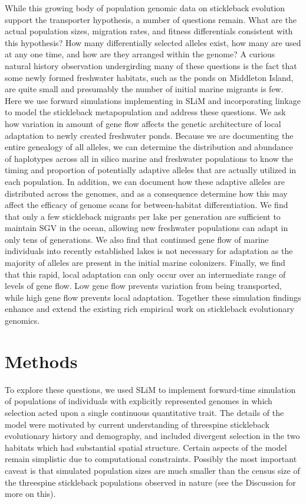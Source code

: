 \documentclass{article}
\begin{document}
While this growing body of population genomic data on stickleback evolution support the transporter hypothesis, a number of questions remain. What are the actual population sizes, migration rates, and fitness differentials consistent with this hypothesis? How many differentially selected alleles exist, how many are used at any one time, and how are they arranged within the genome? A curious natural history observation undergirding many of these questions is the fact that some newly formed freshwater habitats, such as the ponds on Middleton Island, are quite small and presumably the number of initial marine migrants is few. Here we use forward simulations implementing in SLiM and incorporating linkage to model the stickleback metapopulation and address these questions. We ask how variation in amount of gene flow affects the genetic architecture of local adaptation to newly created freshwater ponds. Because we are documenting the entire genealogy of all alleles, we can determine the distribution and abundance of haplotypes across all in silico marine and freshwater populations to know the timing and proportion of potentially adaptive alleles that are actually utilized in each population. In addition, we can document how these adaptive alleles are distributed across the genomes, and as a consequence determine how this may affect the efficacy of genome scans for between-habitat differentiation. We find that only a few stickleback migrants per lake per generation are sufficient to maintain SGV in the ocean, allowing new freshwater populations can adapt in only tens of generations. We also find that continued gene flow of marine individuals into recently established lakes is not necessary for adaptation as the majority of alleles are present in the initial marine colonizers. Finally, we find that this rapid, local adaptation can only occur over an intermediate range of levels of gene flow. Low gene flow prevents variation from being transported, while high gene flow prevents local adaptation. Together these simulation findings enhance and extend the existing rich empirical work on stickleback evolutionary genomics.

\section*{Methods}

To explore these questions, we used SLiM \citep{haller2017slim,haller2018slim3} to implement forward-time simulation of populations of individuals with explicitly represented genomes in which selection acted upon a single continuous quantitative trait. The details of the model were motivated by current understanding of threespine stickleback evolutionary history and demography, and included divergent selection in the two habitats which had substantial spatial structure. Certain aspects of the model remain simplistic due to computational constraints. Possibly the most important caveat is that simulated population sizes are much smaller than the census size of the threespine stickleback populations observed in nature (see the Discussion for more on this).
\end{document}
